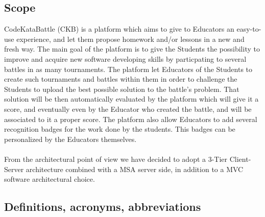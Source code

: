 \documentclass{article}
\begin{document}
    \subsection{Scope}
        CodeKataBattle (CKB) is a platform which aims to give to Educators an easy-to-use experience, and let
        them propose homework and/or lessons in a new and fresh way.
        The main goal of the platform is to give the Students the possibility to improve and acquire new software
        developing skills by particpating to several battles in as many tournaments.
        The platform let Educators of the Students to create such tournaments and battles within them
        in order to challenge the Students to upload the best possible solution to the battle's
        problem. That solution will be then automatically evaluated by the platform which will give it a score,
        and eventually even by the Educator who created the battle, and will be associated to it a proper score.
        The platform also allow Educators to add several recognition badges for the work done by the students.
        This badges can be personalized by the Educators themselves.
        \\ \\
        From the architectural point of view we have decided to adopt a 3-Tier Client-Server architecture combined
        with a MSA server side, in addition to a MVC software architectural choice.
    \subsection{Definitions, acronyms, abbreviations}
\end{document}
